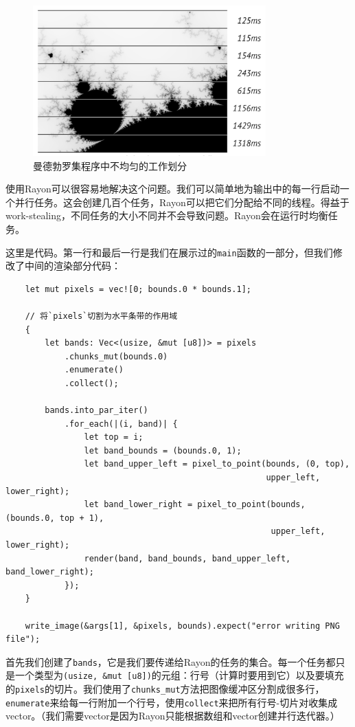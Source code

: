 \begin{figure}[htbp]
    \centering
    \includegraphics[width=0.8\textwidth]{../img/f19-4.png}
    \caption{曼德勃罗集程序中不均匀的工作划分}
    \label{f19-4}
\end{figure}

使用Rayon可以很容易地解决这个问题。我们可以简单地为输出中的每一行启动一个并行任务。这会创建几百个任务，Rayon可以把它们分配给不同的线程。得益于work-stealing，不同任务的大小不同并不会导致问题。Rayon会在运行时均衡任务。

这里是代码。第一行和最后一行是我们在展示过的\texttt{main}函数的一部分，但我们修改了中间的渲染部分代码：
\begin{verbatim}
    let mut pixels = vec![0; bounds.0 * bounds.1];

    // 将`pixels`切割为水平条带的作用域
    {
        let bands: Vec<(usize, &mut [u8])> = pixels
            .chunks_mut(bounds.0)
            .enumerate()
            .collect();
        
        bands.into_par_iter()
            .for_each(|(i, band)| {
                let top = i;
                let band_bounds = (bounds.0, 1);
                let band_upper_left = pixel_to_point(bounds, (0, top),
                                                     upper_left, lower_right);
                let band_lower_right = pixel_to_point(bounds, (bounds.0, top + 1),
                                                      upper_left, lower_right);
                render(band, band_bounds, band_upper_left, band_lower_right);
            });
    }

    write_image(&args[1], &pixels, bounds).expect("error writing PNG file");
\end{verbatim}

首先我们创建了\texttt{bands}，它是我们要传递给Rayon的任务的集合。每一个任务都只是一个类型为\texttt{(usize, \&mut [u8])}的元组：行号（计算时要用到它）以及要填充的\texttt{pixels}的切片。我们使用了\texttt{chunks\_mut}方法把图像缓冲区分割成很多行，\texttt{enumerate}来给每一行附加一个行号，使用\texttt{collect}来把所有行号-切片对收集成vector。（我们需要vector是因为Rayon只能根据数组和vector创建并行迭代器。）

